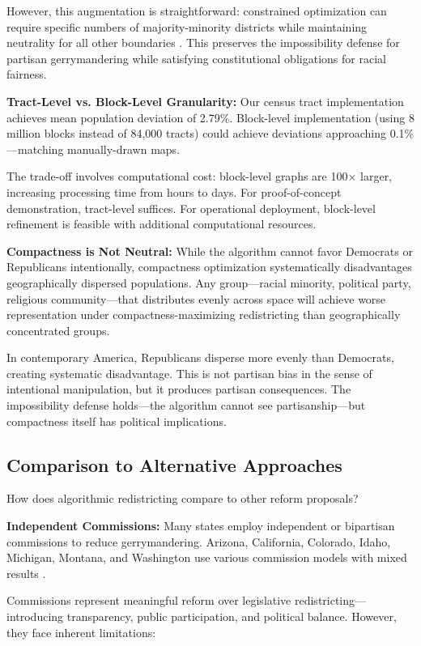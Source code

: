 However, this augmentation is straightforward: constrained optimization can require specific numbers of majority-minority districts while maintaining neutrality for all other boundaries \cite{duchin2018gerrymandering}. This preserves the impossibility defense for partisan gerrymandering while satisfying constitutional obligations for racial fairness.

\textbf{Tract-Level vs. Block-Level Granularity:} Our census tract implementation achieves mean population deviation of 2.79\%. Block-level implementation (using 8 million blocks instead of 84,000 tracts) could achieve deviations approaching 0.1\%—matching manually-drawn maps.

The trade-off involves computational cost: block-level graphs are 100× larger, increasing processing time from hours to days. For proof-of-concept demonstration, tract-level suffices. For operational deployment, block-level refinement is feasible with additional computational resources.

\textbf{Compactness is Not Neutral:} While the algorithm cannot favor Democrats or Republicans intentionally, compactness optimization systematically disadvantages geographically dispersed populations. Any group—racial minority, political party, religious community—that distributes evenly across space will achieve worse representation under compactness-maximizing redistricting than geographically concentrated groups.

In contemporary America, Republicans disperse more evenly than Democrats, creating systematic disadvantage. This is not partisan bias in the sense of intentional manipulation, but it produces partisan consequences. The impossibility defense holds—the algorithm cannot see partisanship—but compactness itself has political implications.

\subsection{Comparison to Alternative Approaches}

How does algorithmic redistricting compare to other reform proposals?

\textbf{Independent Commissions:} Many states employ independent or bipartisan commissions to reduce gerrymandering. Arizona, California, Colorado, Idaho, Michigan, Montana, and Washington use various commission models with mixed results \cite{stephanopoulos2015partisan}.

Commissions represent meaningful reform over legislative redistricting—introducing transparency, public participation, and political balance. However, they face inherent limitations:

